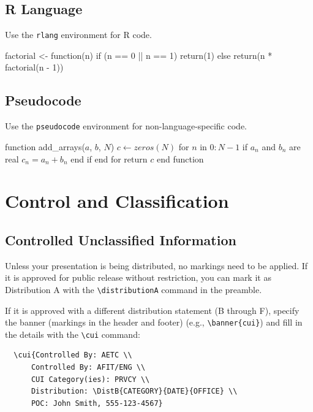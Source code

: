 \documentclass{afitdefense}
\begin{document}
\section{R Language}

Use the \verb|rlang| environment for R code.
\begin{rlang}
factorial <- function(n) {
    if (n == 0 || n == 1) {
        return(1)
    } else {
        return(n * factorial(n - 1))
    }
}
\end{rlang}

\section{Pseudocode}

Use the \verb|pseudocode| environment for non-language-specific code.
\begin{pseudocode}
function add_arrays($a$, $b$, $N$)
    $c \gets zeros(N)$
    for $n$ in $0:N-1$
        if $a_n$ and $b_n$ are real
            $c_n = a_n + b_n$
        end if
    end for
    return $c$
end function
\end{pseudocode}

\chapter{Control and Classification}

\section{Controlled Unclassified Information}

Unless your presentation is being distributed, no markings need to be applied.
If it is approved for public release without restriction, you can mark it as
Distribution A with the \verb|\distributionA| command in the preamble.

If it is approved with a different distribution statement (B through F), specify
the banner (markings in the header and footer) (e.g., \verb|\banner{cui}|) and
fill in the details with the \verb|\cui| command:
\begin{verbatim}
  \cui{Controlled By: AETC \\
      Controlled By: AFIT/ENG \\
      CUI Category(ies): PRVCY \\
      Distribution: \DistB{CATEGORY}{DATE}{OFFICE} \\
      POC: John Smith, 555-123-4567}
\end{verbatim}
\end{document}
